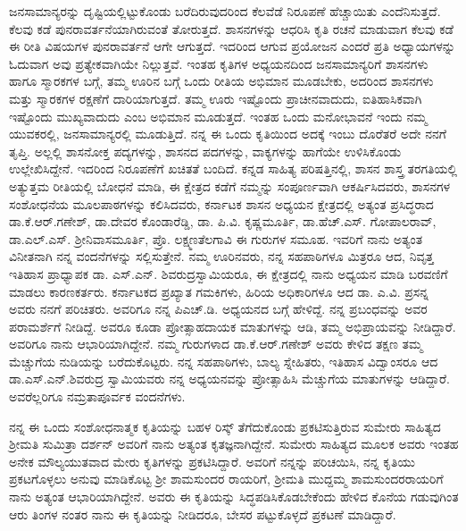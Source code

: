 ಜನಸಾಮಾನ್ಯರನ್ನು ದೃಷ್ಟಿಯಲ್ಲಿಟ್ಟುಕೊಂಡು ಬರೆದಿರುವುದರಿಂದ ಕೆಲವೆಡೆ ನಿರೂಪಣೆ ಹೆಚ್ಚಾಯಿತು ಎಂದೆನಿಸುತ್ತದೆ. ಕೆಲವು ಕಡೆ ಪುನರಾವರ್ತನೆಯಾಗಿರುವಂತೆ ತೋರುತ್ತದೆ. ಶಾಸನಗಳನ್ನು ಆಧರಿಸಿ ಕೃತಿ ರಚನೆ ಮಾಡುವಾಗ ಕೆಲವು ಕಡೆ ಈ ರೀತಿ ವಿಷಯಗಳ ಪುನರಾವರ್ತನೆ ಆಗೇ ಆಗುತ್ತದೆ. ಇದರಿಂದ ಆಗುವ ಪ್ರಯೋಜನ ಎಂದರೆ ಪ್ರತಿ ಅಧ್ಯಾಯಗಳನ್ನು ಓದುವಾಗ ಅವು ಪ್ರತ್ಯೇಕವಾಗಿಯೇ ನಿಲ್ಲುತ್ತವೆ. ಇಂತಹ ಕೃತಿಗಳ ಅಧ್ಯಯನದಿಂದ ಜನಸಾಮಾನ್ಯರಿಗೆ ಶಾಸನಗಳು ಹಾಗೂ ಸ್ಮಾರಕಗಳ ಬಗ್ಗೆ, ತಮ್ಮ ಊರಿನ ಬಗ್ಗೆ ಒಂದು ರೀತಿಯ ಅಭಿಮಾನ ಮೂಡಬೇಕು, ಅದರಿಂದ ಶಾಸನಗಳು ಮತ್ತು ಸ್ಮಾರಕಗಳ ರಕ್ಷಣೆಗೆ ದಾರಿಯಾಗುತ್ತದೆ. ತಮ್ಮ ಊರು ಇಷ್ಟೊಂದು ಪ್ರಾಚೀನವಾದುದು, ಐತಿಹಾಸಿಕವಾಗಿ ಇಷ್ಟೊಂದು ಮುಖ್ಯವಾದುದು ಎಂಬ ಅಭಿಮಾನ ಮೂಡುತ್ತದೆ. ಇಂತಹ ಒಂದು ಮನೋಭಾವನೆ ಇಂದು ನಮ್ಮ ಯುವಕರಲ್ಲಿ, ಜನಸಾಮಾನ್ಯರಲ್ಲಿ ಮೂಡುತ್ತಿದೆ. ನನ್ನ ಈ ಒಂದು ಕೃತಿಯಿಂದ ಅದಕ್ಕೆ ಇಂಬು ದೊರೆತರೆ ಅದೇ ನನಗೆ ತೃಪ್ತಿ. ಅಲ್ಲಲ್ಲಿ ಶಾಸನೋಕ್ತ ಪದ್ಯಗಳನ್ನು, ಶಾಸನದ ಪದಗಳನ್ನು, ವಾಕ್ಯಗಳನ್ನು ಹಾಗೆಯೇ ಉಳಿಸಿಕೊಂಡು ಉಲ್ಲೇಖಿಸಿದ್ದೇನೆ. ಇದರಿಂದ ನಿರೂಪಣೆಗೆ ಖಚಿತತೆ ಬಂದಿದೆ. ಕನ್ನಡ ಸಾಹಿತ್ಯ ಪರಿಷತ್ತಿನಲ್ಲಿ, ಶಾಸನ ಶಾಸ್ತ್ರ ತರಗತಿಯಲ್ಲಿ ಅತ್ಯುತ್ತಮ ರೀತಿಯಲ್ಲಿ ಬೋಧನೆ ಮಾಡಿ, ಈ ಕ್ಷೇತ್ರದ ಕಡೆಗೆ ನಮ್ಮನ್ನು ಸಂಪೂರ್ಣವಾಗಿ ಆಕರ್ಷಿಸಿದವರು, ಶಾಸನಗಳ ಸಂಶೋಧನೆಯ ಮೂಲಪಾಠಗಳನ್ನು ಕಲಿಸಿದವರು, ಕರ್ನಾಟಕ ಶಾಸನ ಅಧ್ಯಯನ ಕ್ಷೇತ್ರದಲ್ಲಿ ಅತ್ಯಂತ ಪ್ರಸಿದ್ಧರಾದ ಡಾ.ಕೆ.ಆರ್​.ಗಣೇಶ್​, ಡಾ.ದೇವರ ಕೊಂಡಾರೆಡ್ಡಿ, ಡಾ. ಪಿ.ವಿ. ಕೃಷ್ಣಮೂರ್ತಿ, ಡಾ.ಹೆಚ್​.ಎಸ್​. ಗೋಪಾಲರಾವ್​, ಡಾ.ಎಲ್​.ಎಸ್​. ಶ‍್ರೀನಿವಾಸಮೂರ್ತಿ, ಪ್ರೊ. ಲಕ್ಷ್ಮಣತೆಲಗಾವಿ ಈ ಗುರುಗಳ ಸಮೂಹ. ಇವರಿಗೆ ನಾನು ಅತ್ಯಂತ ವಿನೀತನಾಗಿ ನನ್ನ ವಂದನೆಗಳನ್ನು ಸಲ್ಲಿಸುತ್ತೇನೆ. ನಮ್ಮ ಊರಿನವರು, ನನ್ನ ಸಹಪಾಠಿಗಳೂ ಮಿತ್ರರೂ ಆದ, ನಿವೃತ್ತ ಇತಿಹಾಸ ಪ್ರಾಧ್ಯಾಪಕ ಡಾ. ಎಸ್​.ಎನ್​. ಶಿವರುದ್ರಸ್ವಾಮಿಯರೂ, ಈ ಕ್ಷೇತ್ರದಲ್ಲಿ ನಾನು ಅಧ್ಯಯನ ಮಾಡಿ ಬರವಣಿಗೆ ಮಾಡಲು ಕಾರಣಕರ್ತರು. ಕರ್ನಾಟಕದ ಪ್ರಖ್ಯಾತ ಗಮಕಿಗಳು, ಹಿರಿಯ ಅಧಿಕಾರಿಗಳೂ ಆದ ಡಾ. ಎ.ವಿ. ಪ್ರಸನ್ನ ಅವರು ನನಗೆ ಪರಿಚಿತರು. ಅವರಿಗೂ ನನ್ನ ಪಿಎಚ್​.ಡಿ. ಅಧ್ಯಯನದ ಬಗ್ಗೆ ಹೇಳಿದ್ದೆ. ನನ್ನ ಪ್ರಬಂಧವನ್ನು ಅವರ ಪರಾಮರ್ಶೆಗೆ ನೀಡಿದ್ದೆ. ಅವರೂ ಕೂಡಾ ಪ್ರೋತ್ಸಾಹದಾಯಕ ಮಾತುಗಳನ್ನು ಆಡಿ, ತಮ್ಮ ಅಭಿಪ್ರಾಯವನ್ನು ನೀಡಿದ್ದಾರೆ. ಅವರಿಗೂ ನಾನು ಆಭಾರಿಯಾಗಿದ್ದೇನೆ. ನಮ್ಮ ಗುರುಗಳಾದ ಡಾ.ಕೆ.ಆರ್​.ಗಣೇಶ್​ ಅವರು ಕೇಳಿದ ತಕ್ಷಣ ತಮ್ಮ ಮೆಚ್ಚುಗೆಯ ನುಡಿಯನ್ನು ಬರೆದುಕೊಟ್ಟರು. ನನ್ನ ಸಹಪಾಠಿಗಳು, ಬಾಲ್ಯ ಸ್ನೇಹಿತರು, ಇತಿಹಾಸ ವಿದ್ವಾಂಸರೂ ಆದ ಡಾ.ಎಸ್​.ಎನ್​.ಶಿವರುದ್ರ ಸ್ವಾಮಿಯವರು ನನ್ನ ಅಧ್ಯಯನವನ್ನು ಪ್ರೋತ್ಸಾಹಿಸಿ ಮೆಚ್ಚುಗೆಯ ಮಾತುಗಳನ್ನು ಆಡಿದ್ದಾರೆ. ಅವರೆಲ್ಲರಿಗೂ ನಮ್ರತಾಪೂರ್ವಕ ವಂದನೆಗಳು.

ನನ್ನ ಈ ಒಂದು ಸಂಶೋಧನಾತ್ಮಕ ಕೃತಿಯನ್ನು ಬಹಳ ರಿಸ್ಕ್​ ತೆಗೆದುಕೊಂಡು ಪ್ರಕಟಿಸುತ್ತಿರುವ ಸುಮೇರು ಸಾಹಿತ್ಯದ ಶ‍್ರೀಮತಿ ಸುಮಿತ್ರಾ ದರ್ಶನ್​ ಅವರಿಗೆ ನಾನು ಅತ್ಯಂತ ಕೃತಜ್ಞನಾಗಿದ್ದೇನೆ. ಸುಮೇರು ಸಾಹಿತ್ಯದ ಮೂಲಕ ಅವರು ಇಂತಹ ಅನೇಕ ಮೌಲ್ಯಯುತವಾದ ಮೇರು ಕೃತಿಗಳನ್ನು ಪ್ರಕಟಿಸಿದ್ದಾರೆ. ಅವರಿಗೆ ನನ್ನನ್ನು ಪರಿಚಯಿಸಿ, ನನ್ನ ಕೃತಿಯು ಪ್ರಕಟಗೊಳ್ಳಲು ಅನುವು ಮಾಡಿಕೊಟ್ಟ ಶ‍್ರೀ ಶಾಮಸುಂದರ ರಾಯರಿಗೆ, ಶ‍್ರೀಮತಿ ಮುದ್ದಮ್ಮ ಶಾಮಸುಂದರರಾಯರಿಗೆ ನಾನು ಅತ್ಯಂತ ಆಭಾರಿಯಾಗಿದ್ದೇನೆ. ಅವರು ಈ ಕೃತಿಯನ್ನು ಸಿದ್ಧಪಡಿಸಿಕೊಡಬೇಕೆಂದು ಹೇಳಿದ ಕೊನೆಯ ಗಡುವುಗಿಂತ ಆರು ತಿಂಗಳ ನಂತರ ನಾನು ಈ ಕೃತಿಯನ್ನು ನೀಡಿದರೂ, ಬೇಸರ ಪಟ್ಟುಕೊಳ್ಳದೆ ಪ್ರಕಟಣೆ ಮಾಡಿದ್ದಾರೆ.

